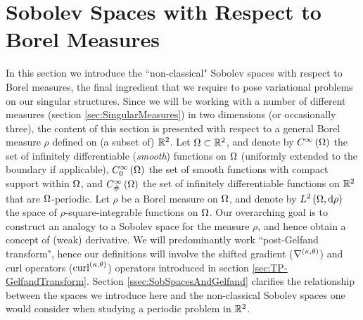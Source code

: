 \section{Sobolev Spaces with Respect to Borel Measures} \label{sec:BorelMeasSobSpaces}
In this section we introduce the ``non-classical" Sobolev spaces with respect to Borel measures, the final ingredient that we require to pose variational problems on our singular structures.
Since we will be working with a number of different measures (section \ref{sec:SingularMeasures}) in two dimensions (or occasionally three), the content of this section is presented with respect to a general Borel measure $\rho$ defined on (a subset of) $\mathbb{R}^2$.
Let $\Omega\subset\mathbb{R}^2$, and denote by $C^{\infty}\left( \Omega \right)$ the set of infinitely differentiable (\emph{smooth}) functions on $\Omega$ (uniformly extended to the boundary if applicable), $C^{\infty}_{0}\left( \Omega \right)$ the set of smooth functions with compact support within $\Omega$, and $C^{\infty}_{\#}\left( \Omega \right)$ the set of infinitely differentiable functions on $\mathbb{R}^2$ that are $\Omega$-periodic.
Let $\rho$ be a Borel measure on $\Omega$, and denote by $L^{2}\left( \Omega,\mathrm{d} \rho \right)$ the space of $\rho$-square-integrable functions on $\Omega$.
Our overarching goal is to construct an analogy to a Sobolev space for the measure $\rho$, and hence obtain a concept of (weak) derivative.
We will predominantly work ``post-Gelfand transform", hence our definitions will involve the shifted gradient ($\nabla^{\left( \kappa, \theta \right)}$) and curl operators ($\mathrm{curl}_{}^{\left( \kappa, \theta \right)}$) operators introduced in section \ref{sec:TP-GelfandTransform}.
Section \ref{ssec:SobSpacesAndGelfand} clarifies the relationship between the spaces we introduce here and the non-classical Sobolev spaces one would consider when studying a periodic problem in $\mathbb{R}^2$.

